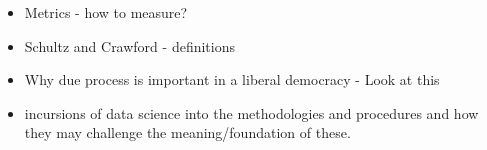 \documentclass[12pt]{article} %
\begin{document}













\newpage



\newpage
{}
\begin{itemize}
\item Metrics - how to measure?
\item Schultz and Crawford - definitions
\item Why due process is important in a liberal democracy - Look at this
\item incursions of data science into the methodologies and procedures and how they may challenge the meaning/foundation of these.
\end{itemize}
\end{document}

